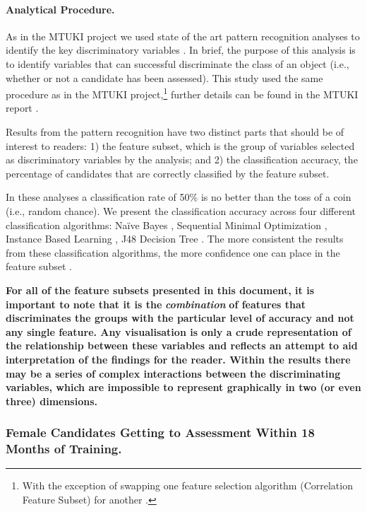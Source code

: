\documentclass[
  12pt,
  a4paper,
]{book}
\begin{document}
\hypertarget{mts-part-b-analytical-procedure}{%
\paragraph{Analytical Procedure.}\label{mts-part-b-analytical-procedure}}

As in the MTUKI project we used state of the art pattern recognition analyses to identify the key discriminatory variables \citep{Duda2000}. In brief, the purpose of this analysis is to identify variables that can successful discriminate the class of an object (i.e., whether or not a candidate has been assessed). This study used the same procedure as in the MTUKI project,\footnote{With the exception of swapping one feature selection algorithm (Correlation Feature Subset) for another \citep[Fast Correlation Based Filter;][]{Yu2003}.} further details can be found in the MTUKI report \citep[see][ pg 31 for details]{Hardy2019b}.

Results from the pattern recognition have two distinct parts that should be of interest to readers: 1) the feature subset, which is the group of variables selected as discriminatory variables by the analysis; and 2) the classification accuracy, the percentage of candidates that are correctly classified by the feature subset.

In these analyses a classification rate of 50\% is no better than the toss of a coin (i.e., random chance). We present the classification accuracy across four different classification algorithms: Naïve Bayes \citep[NB;][]{John1995}, Sequential Minimal Optimization \citep[SMO;][]{Platt1998}, Instance Based Learning \citep[IBk;][]{Aha1991} , J48 Decision Tree \citep[J48;][]{Quinlan1993}. The more consistent the results from these classification algorithms, the more confidence one can place in the feature subset \citep{Gullich2019}.

\textbf{For all of the feature subsets presented in this document, it is important to note that it is the} \emph{\textbf{combination}} \textbf{of features that discriminates the groups with the particular level of accuracy and not any single feature. Any visualisation is only a crude representation of the relationship between these variables and reflects an attempt to aid interpretation of the findings for the reader. Within the results there may be a series of complex interactions between the discriminating variables, which are impossible to represent graphically in two (or even three) dimensions.}

\hypertarget{mts-part-b-female-gta}{%
\subsubsection{Female Candidates Getting to Assessment Within 18 Months of Training.}\label{mts-part-b-female-gta}}
\end{document}

